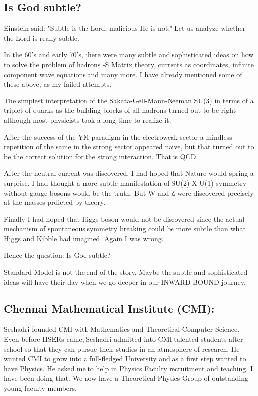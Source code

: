 \subsection*{Is God subtle?}

Einstein said: "Subtle is the Lord; malicious He is not." Let us analyze 
whether the Lord is really subtle.
\smallskip

In the 60's and early 70's, there were many subtle and sophisticated 
ideas on how to solve the problem of hadrons -S Matrix theory, currents 
as coordinates, infinite component wave equations and many more. I have 
already mentioned some of these above, as my failed attempts.
\smallskip

The simplest interpretation of the Sakata-Gell-Mann-Neeman SU(3) in 
terms of a triplet of quarks as the building blocks of all hadrons 
turned out to be right although most physicists took a long time to 
realize it.
\smallskip

After the success of the YM paradigm in the electroweak sector a 
mindless repetition of the same in the strong sector appeared naive, but 
that turned out to be the correct solution for the strong interaction. 
That is QCD.
\smallskip

After the neutral current was discovered, I had hoped that Nature would 
spring a surprise. I had thought a more subtle manifestation of SU(2) X 
U(1) symmetry without gauge bosons would be the truth. But W and Z were 
discovered precisely at the masses prdicted by theory.
\smallskip

Finally I had hoped that Higgs boson would not be discovered since the 
actual mechanism of spontaneous symmetry breaking could be more subtle 
than what Higgs and Kibble had imagined. Again I was wrong.
\smallskip

Hence the question: Is God subtle?
\smallskip

Standard Model is not the end of the story. Maybe the subtle and 
sophisticated ideas will have their day when we go deeper in our INWARD 
BOUND journey.

\subsection*{Chennai Mathematical Institute (CMI): }

Seshadri founded CMI with Mathematics and Theoretical Computer Science. 
Even before IISERs came, Seshadri admitted into CMI talented students 
after school so that they can pursue their studies in an atmosphere of 
research. He wanted CMI to grow into a full-fledged University and as a 
first step wanted to have Physics. He asked me to help in Physics 
Faculty recruitment and teaching. I have been doing that. We now have a 
Theoretical Physics Group of outstanding young faculty members.
\smallskip

